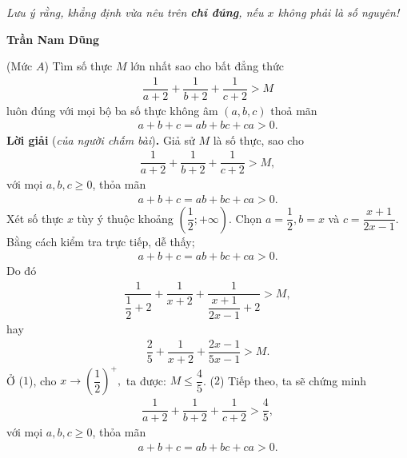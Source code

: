 \begin{multicols}{2}
	\vskip 0.05cm
	\textit{Lưu ý rằng, khẳng định vừa nêu trên \textbf{\color{thachthuctoanhoc}chỉ đúng}, nếu $x$ không phải là số nguyên!}
	\begin{flushright}
		\textbf{\color{thachthuctoanhoc}Trần Nam Dũng}
	\end{flushright}
	{}
	(Mức $A$) Tìm số thực $M$ lớn nhất sao cho bất đẳng thức 
	\begin{align*}
		\dfrac{1}{{a + 2}} + \dfrac{1}{{b + 2}} + \dfrac{1}{{c + 2}} > M
	\end{align*}
	luôn đúng với mọi bộ ba số thực không âm $(a,b,c)$ thoả mãn  
	\begin{align*}
		a+b+c=ab+bc+ca>0.
	\end{align*}
	\textbf{\color{thachthuctoanhoc}Lời giải} (\textit{của người chấm bài})\textbf{\color{thachthuctoanhoc}.}
	\vskip 0.05cm
	Giả sử $M$ là số thực, sao cho
	\begin{align*}
		\dfrac{1}{{a + 2}} + \dfrac{1}{{b + 2}} + \dfrac{1}{{c + 2}} > M,
	\end{align*}
	với mọi $a, b, c \ge  0$, thỏa mãn 
	\begin{align*}
		a + b + c = ab + bc + ca > 0.
	\end{align*}
	Xét số thực $x$ tùy ý thuộc khoảng $\left( {\dfrac{1}{2}; + \infty } \right).$
	\vskip 0.05cm 
	Chọn  $a = \dfrac{1}{2}, b = x$ và $c = \dfrac{x+1}{2x-1}$.
	\vskip 0.05cm
	Bằng cách kiểm tra trực tiếp, dễ thấy; 
	\begin{align*}
		a + b + c = ab + bc + ca > 0.
	\end{align*}
	Do đó
	\begin{align*}
		\dfrac{1}{{\dfrac{1}{2} + 2}} + \dfrac{1}{{x + 2}} + \dfrac{1}{{\dfrac{{x + 1}}{{2x - 1}} + 2}} > M,
	\end{align*}
	hay                                                                         \begin{align*}
		\dfrac{2}{5} + \dfrac{1}{{x + 2}} + \dfrac{{2x - 1}}{{5x - 1}} > M. \tag{$1$}
	\end{align*}
	Ở ($1$), cho $x \to {\left( {\dfrac{1}{2}} \right)^ + },$ ta được: $M \le \dfrac{4}{5}$. \hfill ($2$)
	\vskip 0.05cm
	Tiếp theo, ta sẽ chứng minh
	\begin{align*}
		\dfrac{1}{{a + 2}} + \dfrac{1}{{b + 2}} + \dfrac{1}{{c + 2}} > \dfrac{4}{5}, \tag{$3$}
	\end{align*}
	với mọi $a, b, c \ge  0$, thỏa mãn
	\begin{align*}
		a + b + c = ab + bc + ca > 0. \tag{$4$}

\end{align*}
\end{multicols}
